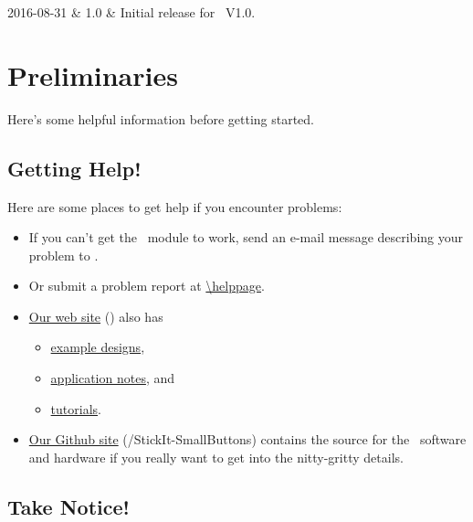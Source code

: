 \documentclass[letterpaper,11pt,oneside]{memoir}
\newcommand{\productrepo}{\github /StickIt-SmallButtons}
\newcommand{\copyrightyear}{ 2016 }
\begin{document}
\frontmatter


\makexesslegal{\copyrightyear}

\begin{xessrevisiontbl}
	2016-08-31 & 1.0 & Initial release for \product\ V1.0.\\
	\hline
\end{xessrevisiontbl}

\makexesstoc

\mainmatter

\chapter{Preliminaries}

Here's some helpful information before getting started.


\section{Getting Help!}

Here are some places to get help if you encounter problems:

\begin{itemize}
\item If you can't get the \product\ module to work, send an e-mail message
	describing your problem to \href{mailto:\helpemail}{\helpemail}. 
\item Or submit a problem report at	\url{\helppage}.
\item \href{\website}{Our web site} (\website) also has
	\begin{itemize}
	\item \href{\website /projects/}{example designs}, 
	\item \href{\website /appnotes/}{application notes}, and
	\item \href{\website /tutorials/}{tutorials}.
	\end{itemize}
\item \href{\productrepo}{Our Github site} (\productrepo) contains the source
    for the \product\ software and hardware if you really want to get into the
    nitty-gritty details.
\end{itemize}


\section{Take Notice!}
\end{document}
